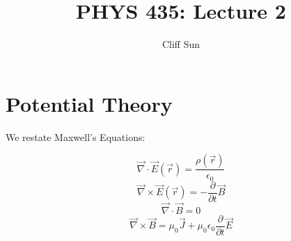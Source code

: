 \documentclass{article}
\title{PHYS 435: Lecture 2}
\author{Cliff Sun}
\newtheorem{one minute paper}[theorem]{One Minute Paper}
\begin{document}
\maketitle

\section*{Potential Theory}

We restate Maxwell's Equations:

\begin{equation}
    \vec{\nabla} \cdot \vec{E}(\vec{r}) = \frac{\rho(\vec{r})}{\epsilon_0}
\end{equation}
\begin{equation}
    \vec{\nabla} \times \vec{E}(\vec{r}) = -\frac{\partial }{\partial t}\vec{B}
\end{equation}
\begin{equation}
    \vec{\nabla} \cdot \vec{B} = 0
\end{equation}
\begin{equation}
    \vec{\nabla} \times \vec{B} = \mu_0 \vec{J} + \mu_0\epsilon_0\frac{\partial }{\partial t}\vec{E}
\end{equation}
\end{document}
